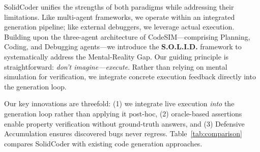 \documentclass[11pt]{article}
\begin{document}
SolidCoder unifies the strengths of both paradigms while addressing their limitations. Like multi-agent frameworks, we operate within an integrated generation pipeline; like external debuggers, we leverage actual execution. Building upon the three-agent architecture of CodeSIM---comprising Planning, Coding, and Debugging agents---we introduce the \textbf{S.O.L.I.D.} framework to systematically address the Mental-Reality Gap. Our guiding principle is straightforward: \textit{don't imagine---execute}. Rather than relying on mental simulation for verification, we integrate concrete execution feedback directly into the generation loop.

Our key innovations are threefold: (1) we integrate live execution \textit{into} the generation loop rather than applying it post-hoc, (2) oracle-based assertions enable property verification without ground-truth answers, and (3) Defensive Accumulation ensures discovered bugs never regress. Table~\ref{tab:comparison} compares SolidCoder with existing code generation approaches.
\end{document}
